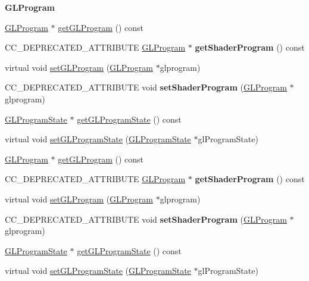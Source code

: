 \begin{Indent}\textbf{ G\+L\+Program}\par
\begin{DoxyCompactItemize}
\item 
\hyperlink{classGLProgram}{G\+L\+Program} $\ast$ \hyperlink{classNode_aae25dd359a8ddb28d552b14269b69ab5}{get\+G\+L\+Program} () const
\item 
\mbox{\label{classNode_aadcd8c8074ec87881efbc5cf9e8f9efe}} 
C\+C\+\_\+\+D\+E\+P\+R\+E\+C\+A\+T\+E\+D\+\_\+\+A\+T\+T\+R\+I\+B\+U\+TE \hyperlink{classGLProgram}{G\+L\+Program} $\ast$ {\bfseries get\+Shader\+Program} () const
\item 
virtual void \hyperlink{classNode_a16ac830f1b38ae931da062c0833b2db0}{set\+G\+L\+Program} (\hyperlink{classGLProgram}{G\+L\+Program} $\ast$glprogram)
\item 
\mbox{\label{classNode_a579457920a0b016ad2d5f566d54229c2}} 
C\+C\+\_\+\+D\+E\+P\+R\+E\+C\+A\+T\+E\+D\+\_\+\+A\+T\+T\+R\+I\+B\+U\+TE void {\bfseries set\+Shader\+Program} (\hyperlink{classGLProgram}{G\+L\+Program} $\ast$glprogram)
\item 
\hyperlink{classGLProgramState}{G\+L\+Program\+State} $\ast$ \hyperlink{classNode_a769007fbb26e8b6ef46096100b57bd20}{get\+G\+L\+Program\+State} () const
\item 
virtual void \hyperlink{classNode_a3fe706d4e7b601eee9ccc8eb8ecf90c0}{set\+G\+L\+Program\+State} (\hyperlink{classGLProgramState}{G\+L\+Program\+State} $\ast$gl\+Program\+State)
\item 
\hyperlink{classGLProgram}{G\+L\+Program} $\ast$ \hyperlink{classNode_ac5a091621fe09d1ddc54d2f7789a71d8}{get\+G\+L\+Program} () const
\item 
\mbox{\label{classNode_aadcd8c8074ec87881efbc5cf9e8f9efe}} 
C\+C\+\_\+\+D\+E\+P\+R\+E\+C\+A\+T\+E\+D\+\_\+\+A\+T\+T\+R\+I\+B\+U\+TE \hyperlink{classGLProgram}{G\+L\+Program} $\ast$ {\bfseries get\+Shader\+Program} () const
\item 
virtual void \hyperlink{classNode_aa257b40f74bea71ab419f2b8d76f6ba4}{set\+G\+L\+Program} (\hyperlink{classGLProgram}{G\+L\+Program} $\ast$glprogram)
\item 
\mbox{\label{classNode_a579457920a0b016ad2d5f566d54229c2}} 
C\+C\+\_\+\+D\+E\+P\+R\+E\+C\+A\+T\+E\+D\+\_\+\+A\+T\+T\+R\+I\+B\+U\+TE void {\bfseries set\+Shader\+Program} (\hyperlink{classGLProgram}{G\+L\+Program} $\ast$glprogram)
\item 
\hyperlink{classGLProgramState}{G\+L\+Program\+State} $\ast$ \hyperlink{classNode_a664a40747cd6cb1410a4521b2dca3bdc}{get\+G\+L\+Program\+State} () const
\item 
virtual void \hyperlink{classNode_a3fe706d4e7b601eee9ccc8eb8ecf90c0}{set\+G\+L\+Program\+State} (\hyperlink{classGLProgramState}{G\+L\+Program\+State} $\ast$gl\+Program\+State)
\end{DoxyCompactItemize}
\end{Indent}
